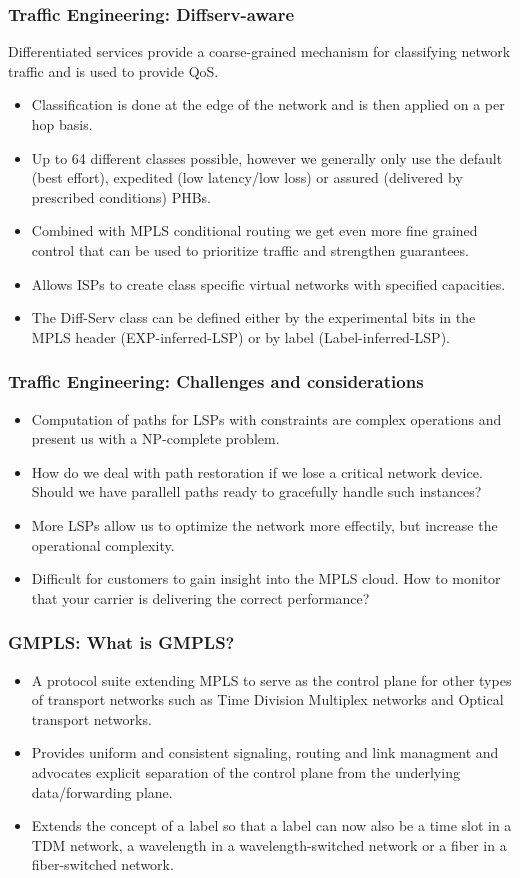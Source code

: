 \documentclass[12pt]{beamer}
\begin{document}
\begin{frame}
  \frametitle{Traffic Engineering: Diffserv-aware}
  Differentiated services provide a coarse-grained mechanism for classifying network traffic and is used to provide QoS.
  \begin{itemize}
      \item Classification is done at the edge of the network and is then applied on a per hop basis.
      \item Up to 64 different classes possible, however we generally only use the default (best effort), expedited (low latency/low loss) or assured (delivered by prescribed conditions) PHBs.
      \item Combined with MPLS conditional routing we get even more fine grained control that can be used to prioritize traffic and strengthen guarantees.
      \item Allows ISPs to create class specific virtual networks with specified capacities.
      \item The Diff-Serv class can be defined either by the experimental bits in the MPLS header (EXP-inferred-LSP) or by label (Label-inferred-LSP). 
  \end{itemize}
\end{frame}

\begin{frame}
  \frametitle{Traffic Engineering: Challenges and considerations}
    \begin{itemize}
      \item Computation of paths for LSPs with constraints are complex operations and present us with a NP-complete problem.
      \item How do we deal with path restoration if we lose a critical network device. Should we have parallell paths ready to gracefully handle such instances?
      \item More LSPs allow us to optimize the network more effectily, but increase the operational complexity.
      \item Difficult for customers to gain insight into the MPLS cloud. How to monitor that your carrier is delivering the correct performance?
  \end{itemize}
\end{frame}

\begin{frame}
  \frametitle{GMPLS: What is GMPLS?}
  \begin{itemize}
    \item A protocol suite extending MPLS to serve as the control plane for other types of transport networks such as Time Division Multiplex networks and Optical transport networks.
    \item Provides uniform and consistent signaling, routing and link managment and advocates explicit separation of the control plane from the underlying data/forwarding plane.
    \item Extends the concept of a label so that a label can now also be a time slot in a TDM network, a wavelength in a wavelength-switched network or a fiber in a fiber-switched network.
  \end{itemize}
\end{frame}
\end{document}
